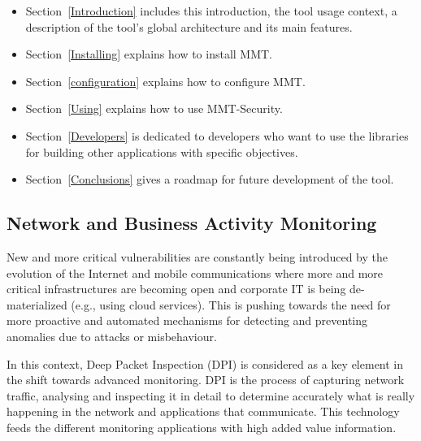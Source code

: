 \begin{itemize}
\item
Section~\ref{Introduction} includes this introduction, the tool usage context, a description of the tool{\textquoteright}s global architecture and its main features.

\item Section~\ref{Installing} explains how to install MMT.

\item Section~\ref{configuration} explains how to configure MMT.

\item Section~\ref{Using} explains how to use MMT-Security.

\item Section~\ref{Developers} is dedicated to developers who want to use the libraries for building other applications with specific objectives.

\item Section~\ref{Conclusions} gives a roadmap for future development of the tool.
\end{itemize}

\subsection{Network and Business Activity Monitoring}

 
New and more critical vulnerabilities are constantly being introduced by the evolution of the Internet and mobile communications where more and more  critical infrastructures are  becoming open and corporate IT is  being de-materialized (e.g., using cloud services). This is pushing towards the need for more proactive and automated mechanisms for detecting and preventing anomalies due to attacks or misbehaviour.

In this context, Deep Packet Inspection (DPI) is considered as a key element in the shift towards advanced monitoring. DPI is the process of capturing network traffic, analysing and inspecting it in detail to determine accurately what is really happening in the network and applications that communicate. This technology feeds the different monitoring applications with high added value information.

